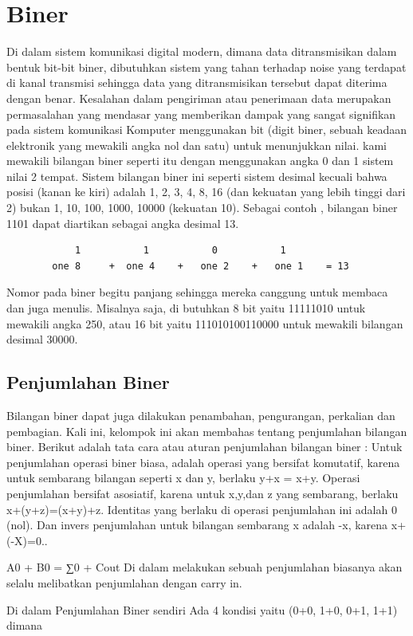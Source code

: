\section {Biner}
	Di dalam sistem komunikasi digital modern, dimana data ditransmisikan dalam bentuk bit-bit biner, dibutuhkan sistem yang tahan terhadap noise yang terdapat di kanal transmisi sehingga data yang ditransmisikan tersebut dapat diterima dengan benar. Kesalahan dalam pengiriman atau penerimaan data merupakan permasalahan yang mendasar yang memberikan dampak yang sangat signifikan pada sistem komunikasi
	Komputer menggunakan bit (digit biner, sebuah keadaan elektronik yang mewakili angka nol dan satu) untuk menunjukkan nilai. kami mewakili bilangan biner seperti itu dengan menggunakan angka 0 dan 1 sistem nilai 2 tempat. Sistem bilangan biner ini seperti sistem desimal kecuali bahwa posisi (kanan ke kiri) adalah 1, 2, 3, 4, 8, 16 (dan kekuatan yang lebih tinggi dari 2) bukan 1, 10, 100, 1000, 10000 (kekuatan 10). Sebagai contoh , bilangan biner 1101 dapat diartikan sebagai angka desimal 13.
		\begin{verbatim}
			1			1			0			1
		one 8	  +	 one 4	  +	  one 2    +   one 1 	= 13
		\end{verbatim}
	Nomor pada  biner begitu panjang sehingga mereka canggung  untuk membaca dan juga menulis. Misalnya saja, di butuhkan 8 bit yaitu  11111010 untuk mewakili angka 250, atau 16 bit yaitu 111010100110000 untuk mewakili bilangan desimal 30000.


	\subsection {Penjumlahan Biner}
	Bilangan biner dapat juga dilakukan penambahan, pengurangan, perkalian dan pembagian. Kali ini, kelompok ini akan membahas tentang penjumlahan bilangan biner. Berikut adalah tata cara atau aturan penjumlahan bilangan biner :
	Untuk penjumlahan operasi biner biasa, adalah operasi yang bersifat komutatif, karena untuk sembarang bilangan seperti x dan y, berlaku y+x = x+y. Operasi penjumlahan bersifat asosiatif, karena untuk x,y,dan z yang sembarang, berlaku x+(y+z)=(x+y)+z. Identitas yang berlaku di operasi penjumlahan ini adalah 0 (nol). Dan invers penjumlahan untuk bilangan sembarang x adalah -x, karena x+(-X)=0..

	A0 + B0 = ∑0 + Cout
	Di dalam melakukan sebuah penjumlahan biasanya akan selalu melibatkan penjumlahan dengan carry in.

	Di dalam Penjumlahan Biner sendiri Ada 4 kondisi yaitu
	(0+0, 1+0, 0+1, 1+1) dimana

